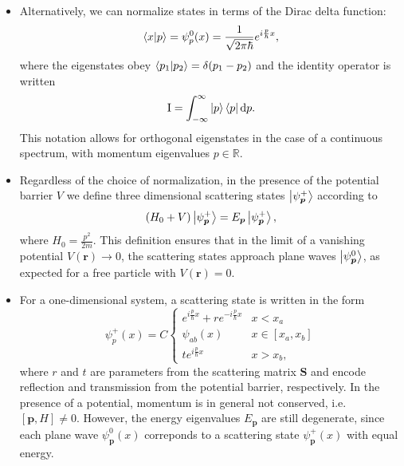\documentclass[11pt, a4paper]{article}
\newcommand{\diff}{\mathop{}\!\mathrm{d}} %
\renewcommand{\vec}[1]{\bm{#1}}  %
\newcommand{\mat}[1]{\mathbf{#1}}  %
\renewcommand{\r}{\vec{r}}  %
\renewcommand{\SS}{\mat{S}}  %
\newcommand{\II}{\operatorname{I}}  %
\begin{document}
\begin{itemize}
    \item Alternatively, we can normalize states in terms of the Dirac delta function:
    \begin{equation*}
        \braket{x}{p} = \psi_{p}^{0}(x) = \frac{1}{\sqrt{2\pi \hbar}} e^{i \frac{p}{\hbar}x},
    \end{equation*}
    where the eigenstates obey $ \braket{p_{1}}{p_{2}} = \delta(p_{1} - p_{2}) $ and the identity operator is written
    \begin{equation*}
        \II = \int_{-\infty}^{\infty} \ket{p} \bra{p} \diff p.
    \end{equation*}
    This notation allows for orthogonal eigenstates in the case of a continuous spectrum, with momentum eigenvalues $ p \in \mathbb{R} $. 
    
    \item Regardless of the choice of normalization, in the presence of the potential barrier $ V $ we define three dimensional scattering states $ \ket{\psi_{\vec{p}}^{+}} $ according to
    \begin{equation*}
        (H_{0} + V) \ket{\psi_{\vec{p}}^{+}} = E_{\vec{p}}\ket{\psi_{\vec{p}}^{+}},
    \end{equation*}
    where $ H_{0} = \frac{p^{2}}{2m} $. This definition ensures that in the limit of a vanishing potential $ V(\vec{r}) \to 0 $, the scattering states approach plane waves $ \ket{\psi_{\vec{p}}^{0}} $, as expected for a free particle with $ V(\r) = 0 $.

    \item For a one-dimensional system, a scattering state is written in the form
    \begin{equation*}
        \psi_{p}^{+}(x) = C
        \begin{cases}
            e^{i \frac{p}{\hbar} x} + r e^{-i \frac{p}{\hbar} x} & x < x_{a}\\
            \psi_{ab}(x) & x \in [x_{a}, x_{b}]\\
            t e^{i \frac{p}{\hbar}x} & x > x_{b},
        \end{cases}
    \end{equation*}
    where $ r $ and $ t $ are parameters from the scattering matrix $ \SS $ and encode reflection and transmission from the potential barrier, respectively. In the presence of a potential, momentum is in general not conserved, i.e. $ [\vec{p}, H] \neq 0 $. However, the energy eigenvalues $ E_{\vec{p}} $ are still degenerate, since each plane wave $ \psi_{\vec{p}}^{0}(x) $ correponds to a scattering state $ \psi_{\vec{p}}^{+}(x) $ with equal energy.


\end{itemize}
\end{document}

